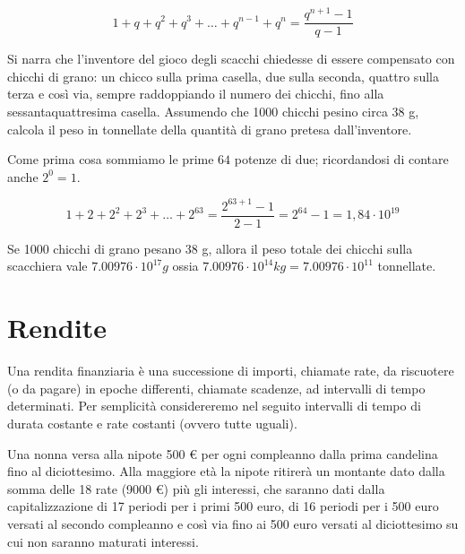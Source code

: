 \begin{definizione}
\[ 1+q+q^2+q^3+\dots + q^{n-1}+q^n=\dfrac{q^{n+1}-1}{q-1} \]
\end{definizione}

\begin{exrig}
\begin{esempio} Si narra che l’inventore del gioco degli scacchi chiedesse 
di essere compensato con chicchi di grano: un chicco sulla prima casella, 
due sulla seconda, quattro sulla terza e così via, sempre raddoppiando il 
numero dei chicchi, fino alla sessantaquattresima casella. Assumendo che 
1000 chicchi pesino circa 38 g, calcola il peso in tonnellate della 
quantità di grano pretesa dall’inventore.

Come prima cosa sommiamo le prime \(64\) potenze di due; ricordandosi di 
contare anche \(2^0=1\).

\[ 1+2+2^2+2^3+\dots + 2^63=\dfrac{2^{63+1}-1}{2-1}=2^{64}-1=1,84 
\cdot10^{19}\]

Se 1000 chicchi di grano pesano 38 g, allora il peso totale dei chicchi 
sulla scacchiera vale  
\(7.00976\cdot10^{17} g\)
ossia 
\(7.00976\cdot10^{14} kg = 7.00976\cdot10^{11}\) tonnellate. 

\end{esempio}
\end{exrig}

\section{Rendite}
Una rendita finanziaria è una successione di importi, chiamate rate, da 
riscuotere (o da pagare) in epoche differenti, chiamate scadenze, ad 
intervalli di tempo determinati. Per semplicità considereremo nel seguito 
intervalli di tempo di durata costante e rate costanti (ovvero tutte 
uguali).

\begin{exrig}
\begin{esempio}
\label{nonna}
Una nonna versa alla nipote 500 € per ogni compleanno dalla prima candelina 
fino al diciottesimo. Alla maggiore età la nipote ritirerà un montante dato 
dalla somma delle 18 rate (9000 €) più gli interessi, che saranno dati 
dalla capitalizzazione di 17 periodi per i primi 500 euro, di 16 periodi per 
i 500 euro versati al secondo compleanno e così via fino ai 500 euro versati 
al diciottesimo su cui non saranno maturati interessi.
\end{esempio}
\end{exrig}


